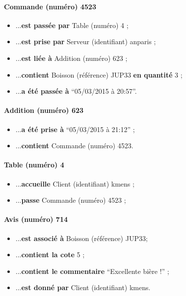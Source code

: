 \paragraph{Commande (numéro) 4523}
\begin{itemize}
	\item ...\textbf{est passée par} Table (numéro) 4 ;
	\item ...\textbf{est prise par} Serveur (identifiant) anparis ;
	\item ...\textbf{est liée à} Addition (numéro) 623 ;
	\item ...\textbf{contient} Boisson (référence) JUP33 \textbf{en quantité} 3 ;		
	\item ...\textbf{a été passée à} ``05/03/2015 à 20:57''.
\end{itemize}

\paragraph{Addition (numéro) 623}
\begin{itemize}
	\item ...\textbf{a été prise à} ``05/03/2015 à 21:12'' ;
	\item ...\textbf{contient} Commande (numéro) 4523.
\end{itemize}

\paragraph{Table (numéro) 4}
\begin{itemize}
	\item ...\textbf{accueille} Client (identifiant) kmens ;
	\item ...\textbf{passe} Commande (numéro) 4523 ;
\end{itemize}

\paragraph{Avis (numéro) 714}
\begin{itemize}
	\item ...\textbf{est associé à} Boisson (référence) JUP33;
	\item ...\textbf{contient la cote} 5 ;
	\item ...\textbf{contient le commentaire} ``Excellente bière !'' ;
	\item ...\textbf{est donné par} Client (identifiant) kmens.
\end{itemize}

